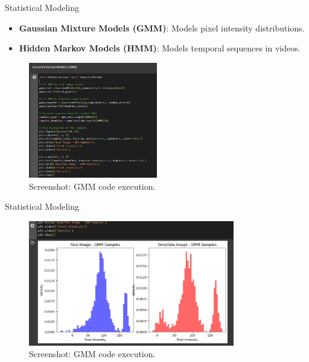 \documentclass{beamer}
\begin{document}
\begin{frame}{Statistical Modeling}
    \begin{itemize}
        \item \textbf{Gaussian Mixture Models (GMM)}: Models pixel intensity distributions.
        \item \textbf{Hidden Markov Models (HMM)}: Models temporal sequences in videos.
    \end{itemize}
    \begin{figure}
        \centering
        \includegraphics[width=0.5\textwidth]{gmm.png} %
        \caption{Screenshot: GMM code execution.}
    \end{figure}
\end{frame} 

\begin{frame}{Statistical Modeling}
    \begin{figure}
        \centering
        \includegraphics[width=0.8\textwidth]{gmm2.png} %
        \caption{Screenshot: GMM code execution.}
    \end{figure}
\end{frame} 
\end{document}

